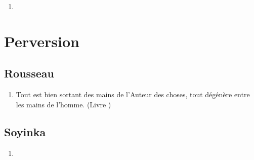 \documentclass[a4paper, 11pt, hidelinks]{article}
\newcommand{\rb}[1]{\Romanbar{#1}}
\begin{document}
\begin{enumerate}
    \item 
\end{enumerate}


























































\section{Perversion}



\subsection{Rousseau}


\begin{enumerate}
    \item Tout est bien sortant des mains de l'Auteur des choses, tout dégénère entre les mains de l'homme. (Livre \rb{1})
\end{enumerate}



\subsection{Soyinka}


\begin{enumerate}
    \item 
\end{enumerate}
\end{document}
